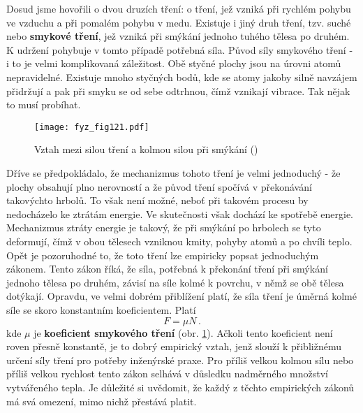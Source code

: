    Dosud jsme hovořili o dvou druzích tření: o tření, jež vzniká při rychlém pohybu ve vzduchu a 
    při pomalém pohybu v medu. Existuje i jiný druh tření, tzv. suché nebo \textbf{smykové tření}, 
    jež vzniká při smýkání jednoho tuhého tělesa po druhém. K udržení pohybuje v tomto případě 
    potřebná síla. Původ síly smykového tření - i to je velmi komplikovaná záležitost. Obě styčné 
    plochy jsou na úrovni atomů nepravidelné. Existuje mnoho styčných bodů, kde se atomy jakoby 
    silně navzájem přidržují a pak při smyku se od sebe odtrhnou, čímž vznikají vibrace. Tak nějak 
    to musí probíhat.
    
    \begin{figure}[ht!]  %
      \centering
      \texttt{[image: fyz\_fig121.pdf]}
      \caption{Vztah mezi silou tření a kolmou silou při smýkání
              (\cite[s.~173]{Feynman01})}
      \label{fyz:fig121}
    \end{figure}
    Dříve se předpokládalo, že mechanizmus tohoto tření je velmi jednoduchý - že plochy obsahují 
    plno nerovností a že původ tření spočívá v překonávání takovýchto hrbolů. To však není možné, 
    neboť při takovém procesu by nedocházelo ke ztrátám energie. Ve skutečnosti však dochází ke 
    spotřebě energie. Mechanizmus ztráty energie je takový, že při smýkání po hrbolech se tyto 
    deformují, čímž v obou tělesech vzniknou kmity, pohyby atomů a po chvíli teplo. Opět je 
    pozoruhodné to, že toto tření lze empiricky popsat jednoduchým zákonem. Tento zákon říká, že 
    síla, potřebná k překonání tření při smýkání jednoho tělesa po druhém, závisí na síle kolmé k 
    povrchu, v němž se obě tělesa dotýkají. Opravdu, ve velmi dobrém přiblížení platí, že síla 
    tření je úměrná kolmé síle se skoro konstantním koeficientem. Platí
    \begin{equation}\label{fyz:eq169}
      \boxed{F = \mu N}\,.
    \end{equation}
    kde \(\mu\) je \textbf{koeficient smykového tření} (obr. \ref{fyz:fig121}). Ačkoli tento 
    koeficient není roven přesně konstantě, je to dobrý empirický vztah, jenž slouží k přibližnému 
    určení síly tření pro potřeby inženýrské praxe. Pro příliš velkou kolmou sílu nebo příliš 
    velkou rychlost tento zákon selhává v důsledku nadměrného množství vytvářeného tepla. Je 
    důležité si uvědomit, že každý z těchto empirických zákonů má svá omezení, mimo nichž přestává 
    platit.
    
